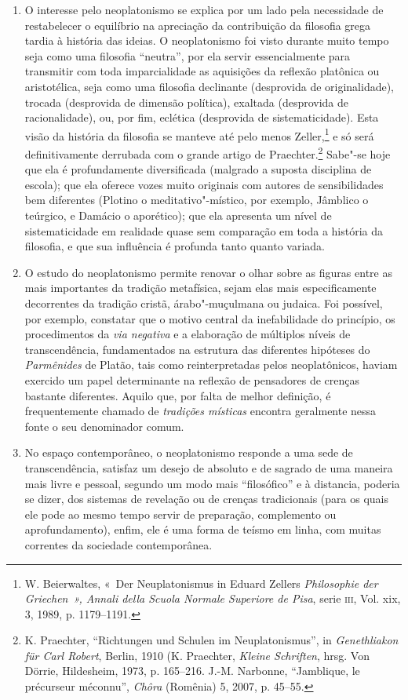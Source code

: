 \begin{enumerate}
\item O interesse pelo neoplatonismo se explica por um lado pela
necessidade de restabelecer o equilíbrio na apreciação da
contribuição da filosofia grega tardia à história das ideias. O
neoplatonismo foi visto durante muito tempo seja como uma filosofia
“neutra”, por ela servir essencialmente para transmitir com toda
imparcialidade as aquisições da reflexão platônica ou aristotélica,
seja como uma filosofia declinante (desprovida de originalidade),
trocada (desprovida de dimensão política), exaltada (desprovida de
racionalidade), ou, por fim, eclética (desprovida de
sistematicidade). Esta visão da história da filosofia se manteve até
pelo menos Zeller,\footnote{ W. Beierwaltes, «~Der Neuplatonismus
in Eduard Zellers \emph{Philosophie der Griechen~», Annali della
Scuola Normale Superiore de Pisa}, serie \textsc{iii}, Vol. xix, 3, 1989, p.
1179--1191.} e só será definitivamente derrubada com o grande
artigo de Praechter.\footnote{ K. Praechter, ``Richtungen und
Schulen im Neuplatonismus'', in \emph{Genethliakon für Carl
Robert}, Berlin, 1910 (K. Praechter, \emph{Kleine
Schriften}, hrsg. Von Dörrie, Hildesheim, 1973, p. 165--216. 
J.-M. Narbonne, ``Jamblique, le précurseur méconnu'',
\emph{Chôra} (Romênia) 5, 2007, p. 45--55.} Sabe"-se hoje que
ela é profundamente diversificada (malgrado a suposta disciplina de
escola); que ela oferece vozes muito originais com autores de
sensibilidades bem diferentes (Plotino o meditativo"-místico, por
exemplo, Jâmblico o teúrgico, e Damácio o aporético); que ela
apresenta um nível de sistematicidade em realidade quase sem
comparação em toda a história da filosofia, e que sua influência é
profunda tanto quanto variada.

\item O estudo do neoplatonismo permite renovar o olhar sobre as figuras
entre as mais importantes da tradição metafísica, sejam elas mais
especificamente decorrentes da tradição cristã, árabo"-muçulmana ou
judaica. Foi possível, por exemplo, constatar que o motivo central da
inefabilidade do princípio, os procedimentos da \emph{via negativa}
e a elaboração de múltiplos níveis de transcendência, fundamentados 
na estrutura das diferentes hipóteses do \emph{Parmênides} de
Platão, tais como reinterpretadas pelos neoplatônicos, haviam
exercido um papel determinante na reflexão de pensadores de crenças
bastante  diferentes. Aquilo que, por falta de melhor definição, é
frequentemente chamado de\emph{ tradições místicas} encontra
geralmente nessa fonte o seu denominador comum.

\item No espaço contemporâneo, o neoplatonismo responde a uma sede de
transcendência, satisfaz um desejo de absoluto e de sagrado de uma
maneira mais livre e pessoal, segundo um modo mais “filosófico” e à
distancia, poderia se dizer, dos sistemas de revelação ou de crenças
tradicionais (para os quais ele pode ao mesmo tempo servir de preparação, complemento
ou aprofundamento), enfim, ele é uma forma de teísmo em linha, com
muitas correntes da sociedade contemporânea.
\end{enumerate}

